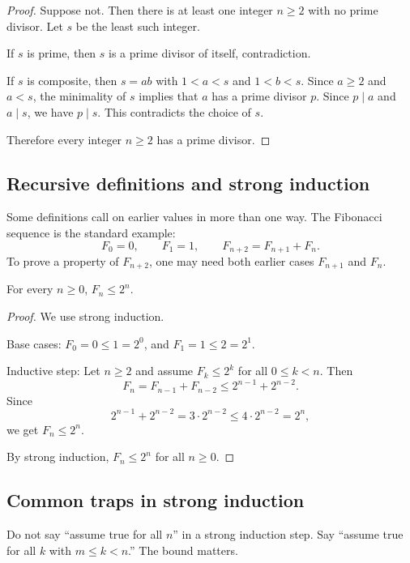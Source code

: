 \begin{proof}
Suppose not. Then there is at least one integer $n\geq2$ with no prime divisor. Let $s$ be the least such integer.

If $s$ is prime, then $s$ is a prime divisor of itself, contradiction.

If $s$ is composite, then $s=ab$ with $1<a<s$ and $1<b<s$. Since $a\geq2$ and $a<s$, the minimality of $s$ implies that $a$ has a prime divisor $p$. Since $p\mid a$ and $a\mid s$, we have $p\mid s$. This contradicts the choice of $s$.

Therefore every integer $n\geq2$ has a prime divisor.
\end{proof}

\subsection{Recursive definitions and strong induction}

Some definitions call on earlier values in more than one way. The Fibonacci sequence is the standard example:
\[
F_0=0,\qquad F_1=1,\qquad F_{n+2}=F_{n+1}+F_n.
\]
To prove a property of $F_{n+2}$, one may need both earlier cases $F_{n+1}$ and $F_n$.

\begin{theorem}
For every $n\geq0$, $F_n\leq2^n$.
\end{theorem}

\begin{proof}
We use strong induction.

Base cases: $F_0=0\leq1=2^0$, and $F_1=1\leq2=2^1$.

Inductive step: Let $n\geq2$ and assume $F_k\leq2^k$ for all $0\leq k<n$. Then
\[
F_n=F_{n-1}+F_{n-2}\leq2^{n-1}+2^{n-2}.
\]
Since
\[
2^{n-1}+2^{n-2}=3\cdot2^{n-2}\leq4\cdot2^{n-2}=2^n,
\]
we get $F_n\leq2^n$.

By strong induction, $F_n\leq2^n$ for all $n\geq0$.
\end{proof}

\subsection{Common traps in strong induction}

\begin{trapbox}
Do not say ``assume true for all $n$'' in a strong induction step. Say ``assume true for all $k$ with $m\leq k<n$.'' The bound matters.
\end{trapbox}

